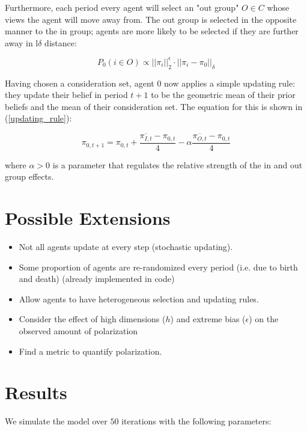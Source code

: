 \documentclass{article}
\begin{document}
Furthermore, each period every agent will select an "out group" $O \in C$ whose views the agent will move away from. The out group is selected in the opposite manner to the in group; agents are more likely to be selected if they are further away in l$\delta$ distance:

\begin{equation}
    P_0(i \in O) \propto {||\pi_i||}_2^\epsilon \cdot {||\pi_i - \pi_0||}_\delta
    \label{outgroup_prob}
\end{equation}

Having chosen a consideration set, agent 0 now applies a simple updating rule: they update their belief in period $t+1$ to be the geometric mean of their prior beliefs and the mean of their consideration set. The equation for this is shown in (\ref{updating_rule}):

\begin{equation}
    \pi_{0, t+1} = \pi_{0, t} + \frac{\overline{\pi_{I, t}} - \pi_{0, t}}{4} - \alpha \frac{\overline{\pi_{O, t}} - \pi_{0, t}}{4}
    \label{updating_rule}
\end{equation}

where $\alpha > 0$ is a parameter that regulates the relative strength of the in and out group effects.

\section{Possible Extensions}

\begin{itemize}
    \item Not all agents update at every step (stochastic updating).
    \item Some proportion of agents are re-randomized every period (i.e. due to birth and death) (already implemented in code)
    \item Allow agents to have heterogeneous selection and updating rules.
    \item Consider the effect of high dimensions ($h$) and extreme bias ($\epsilon$) on the observed amount of polarization 
    \item Find a metric to quantify polarization.
\end{itemize}

\section{Results}
We simulate the model over $50$ iterations with the following parameters:
\end{document}
